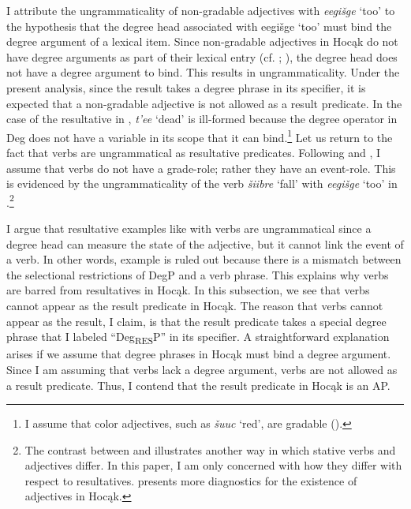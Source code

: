 \documentclass[output=paper]{LSP/langsci}
\begin{document}
I attribute the ungrammaticality of non-gradable adjectives with \textit{eegišge} `too' to the hypothesis that the degree head associated with eegišge `too' must bind the degree argument of a lexical item. Since non-gradable adjectives in Hocąk do not have degree arguments as part of their lexical entry (cf. \citealt{Higginbotham1985}; \citealt{Corver1997}), the degree head does not have a degree argument to bind. This results in ungrammaticality. Under the present analysis, since the result takes a degree phrase in its specifier, it is expected that a non-gradable adjective is not allowed as a result predicate. In the case of the resultative in , \textit{t'ee} `dead' is ill-formed because the degree operator in Deg does not have a variable in its scope that it can bind.\footnote{I assume that color adjectives, such as \textit{šuuc} `red', are gradable (\citealt{KennedyMcNally2010}).} Let us return to the fact that verbs are ungrammatical as resultative predicates. Following \citet{Higginbotham1985} and \citet{Corver1997}, I assume that verbs do not have a grade-role; rather they have an event-role. This is evidenced by the ungrammaticality of the verb \textit{šiibre} `fall' with \textit{eegišge} `too' in .\footnote{The contrast between  and  illustrates another way in which stative verbs and adjectives differ. In this paper, I am only concerned with how they differ with respect to resultatives. \citet{Rosen2014,Rosen2015} presents more diagnostics for the existence of adjectives in Hocąk.}

\begin{exe}


\end{exe}

I argue that resultative examples like  with verbs are ungrammatical since a degree head can measure the state of the adjective, but it cannot link the event of a verb. In other words, example  is ruled out because there is a mismatch between the selectional restrictions of DegP and a verb phrase. This explains why verbs are barred from resultatives in Hocąk. In this subsection, we see that verbs cannot appear as the result predicate in Hocąk. The reason that verbs cannot appear as the result, I claim, is that the result predicate takes a special degree phrase that I labeled ``Deg\textsubscript{RES}P'' in its specifier. A straightforward explanation arises if we assume that degree phrases in Hocąk must bind a degree argument. Since I am assuming that verbs lack a degree argument, verbs are not allowed as a result predicate. Thus, I contend that the result predicate in Hocąk is an AP.
\end{document}
